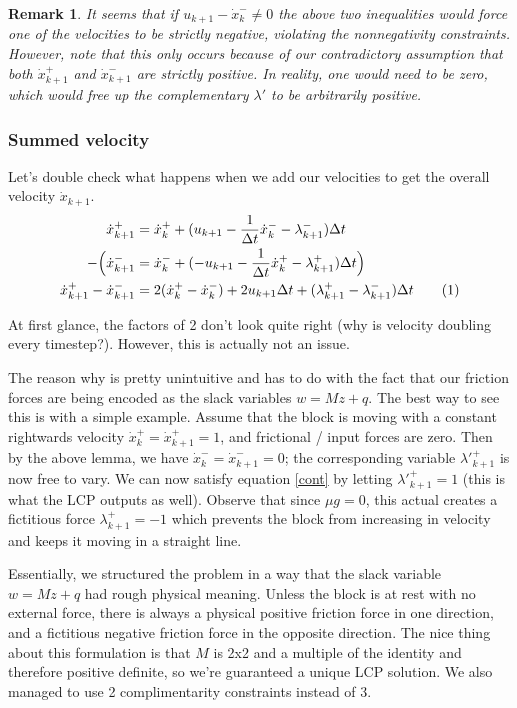 \documentclass{article}
\newtheorem{remark}{Remark}
\newcommand\numberthis{\addtocounter{equation}{1}\tag{\theequation}}
\begin{document}
\begin{remark}
    It seems that if $u_{k+1} - \dot x^-_k \neq 0$ the above two inequalities would force one of the velocities to be strictly negative, violating the nonnegativity constraints. However, note that this only occurs because of our contradictory assumption that both $\dot x^+_{k+1}$ and $\dot x^-_{k+1}$ are strictly positive. In reality, one would need to be zero, which would free up the complementary $\lambda'$ to be arbitrarily positive.
\end{remark}

\subsubsection{Summed velocity}

Let's double check what happens when we add our velocities to get the overall velocity $\dot x_{k+1}$.
\begin{align*}
    \dot x^+_{k+1} &= \dot x^+_k + (u_{k+1} - \frac{1}{\Delta t} \dot x^-_{k} - \lambda^-_{k+1}) \Delta t \\
    - \Big( \dot x^-_{k+1} &= \dot x^-_k + (-u_{k+1} - \frac{1}{\Delta t} \dot x^+_{k} - \lambda^+_{k+1}) \Delta t \Big) \\
    \dot x^+_{k+1} - \dot x^-_{k+1} &= 2 (\dot x^+_k - \dot x^-_k) + 2 u_{k+1} \Delta t + (\lambda^+_{k+1} - \lambda^-_{k+1}) \Delta t \numberthis \label{cont}
\end{align*}

At first glance, the factors of 2 don't look quite right (why is velocity doubling every timestep?). However, this is actually not an issue.

The reason why is pretty unintuitive and has to do with the fact that our friction forces are being encoded as the slack variables $w = Mz + q$. The best way to see this is with a simple example. Assume that the block is moving with a constant rightwards velocity $\dot x^+_k = \dot x^+_{k+1} = 1$, and frictional / input forces are zero. Then by the above lemma, we have $\dot x^-_k = \dot x^-_{k+1} = 0$; the corresponding variable $\lambda'^+_{k+1}$ is now free to vary. We can now satisfy equation \eqref{cont} by letting $\lambda'^+_{k+1} = 1$ (this is what the LCP outputs as well). Observe that since $\mu g = 0$, this actual creates a fictitious force $\lambda^+_{k+1} = -1$ which prevents the block from increasing in velocity and keeps it moving in a straight line.

Essentially, we structured the problem in a way that the slack variable $w = Mz + q$ had rough physical meaning. Unless the block is at rest with no external force, there is always a physical positive friction force in one direction, and a fictitious negative friction force in the opposite direction. The nice thing about this formulation is that $M$ is 2x2 and a multiple of the identity and therefore positive definite, so we're guaranteed a unique LCP solution. We also managed to use 2 complimentarity constraints instead of 3.
\end{document}
